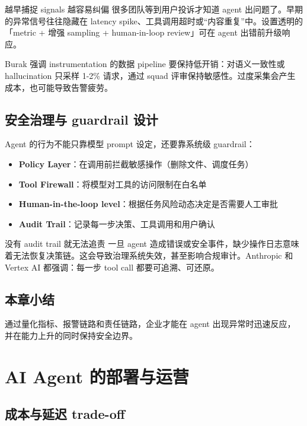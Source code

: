\documentclass[a4paper]{article}
\begin{document}
\begin{knowledgebox}{越早捕捉 signals 越容易纠偏}
很多团队等到用户投诉才知道 agent 出问题了。早期的异常信号往往隐藏在 latency spike、工具调用超时或“内容重复”中。设置透明的「metric + 增强 sampling + human-in-loop review」可在 agent 出错前升级响应。
\end{knowledgebox}

Burak 强调 instrumentation 的数据 pipeline 要保持低开销：对语义一致性或 hallucination 只采样 1-2\% 请求，通过 squad 评审保持敏感性。过度采集会产生成本，也可能导致告警疲劳。

\subsection{安全治理与 guardrail 设计}

Agent 的行为不能只靠模型 prompt 设定，还要靠系统级 guardrail：

\begin{itemize}
    \item \textbf{Policy Layer}：在调用前拦截敏感操作（删除文件、调度任务）
    \item \textbf{Tool Firewall}：将模型对工具的访问限制在白名单
    \item \textbf{Human-in-the-loop level}：根据任务风险动态决定是否需要人工审批
    \item \textbf{Audit Trail}：记录每一步决策、工具调用和用户确认
\end{itemize}

\begin{warningbox}{没有 audit trail 就无法追责}
一旦 agent 造成错误或安全事件，缺少操作日志意味着无法恢复决策链。这会导致治理系统失效，甚至影响合规审计。Anthropic 和 Vertex AI 都强调：每一步 tool call 都要可追溯、可还原。
\end{warningbox}

\subsection{本章小结}

通过量化指标、报警链路和责任链路，企业才能在 agent 出现异常时迅速反应，并在能力上升的同时保持安全边界。

\section{AI Agent 的部署与运营}

\subsection{成本与延迟 trade-off}
\end{document}
